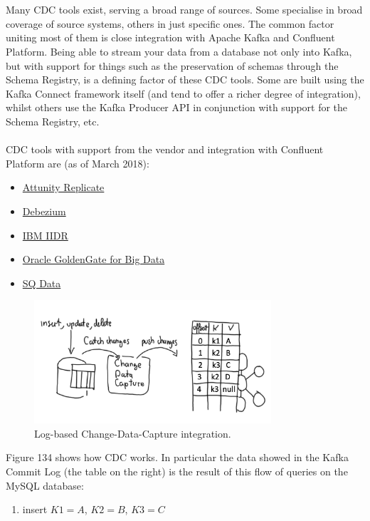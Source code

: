 \documentclass[10pt,a4paper]{article}
\newcommand{\nline}{\\~\\}
\begin{document}
\begin{enumerate}
 \nline
 Many CDC tools exist, serving a broad range of sources. Some specialise in broad coverage of source systems, others in just specific ones. The common factor uniting most of them is close integration with Apache Kafka and Confluent Platform. Being able to stream your data from a database not only into Kafka, but with support for things such as the preservation of schemas through the Schema Registry, is a defining factor of these CDC tools. Some are built using the Kafka Connect framework itself (and tend to offer a richer degree of integration), whilst others use the Kafka Producer API in conjunction with support for the Schema Registry, etc. \nline
 CDC tools with support from the vendor and integration with Confluent Platform are (as of March 2018):
 \begin{itemize}
 	\item \href{https://www.attunity.com/products/replicate/}{Attunity Replicate}
\item \href{https://debezium.io/}{Debezium}
\item \href{https://www.ibm.com/support/knowledgecenter/en/SSTRGZ_11.4.0/com.ibm.cdcdoc.cdckafka.doc/concepts/abouttargetingkafka.html}{IBM IIDR}
\item \href{https://www.oracle.com/middleware/data-integration/goldengate/big-data/index.html}{Oracle GoldenGate for Big Data}
\item \href{https://www.sqdata.com/real-time-streaming-hadoop-kafka/}{SQ Data}
 \end{itemize}
   \begin{figure}[ht!]
 \hfill \includegraphics[width=250pt]{images/kafka-cdc}\hspace*{\fill} 
	\caption{Log-based Change-Data-Capture integration.} 
 \end{figure} 
 \pagebreak
 Figure 134 shows how CDC works. In particular the data showed in the Kafka Commit Log (the table on the right) is the result of this flow of queries on the MySQL database:
 \begin{enumerate}
 	\item insert $K1=A$, $K2=B$, $K3=C$

\end{enumerate}
\end{enumerate}
\end{document}
